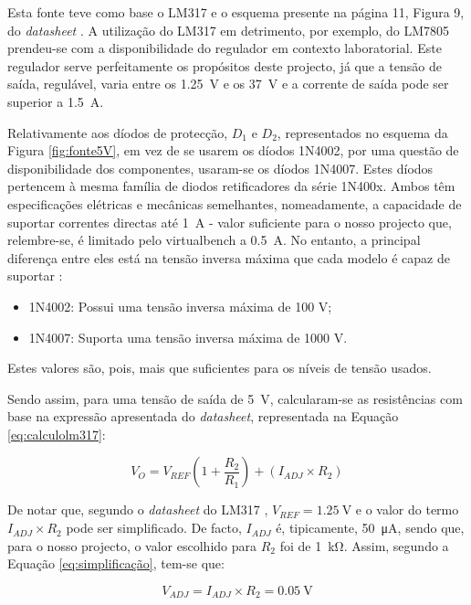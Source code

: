 Esta fonte teve como base o LM317 e o esquema presente na página 11, Figura 9, do \textit{datasheet} \cite{LM317}. A utilização do LM317 em detrimento, por exemplo, do LM7805 prendeu-se com a disponibilidade do regulador em contexto laboratorial. Este regulador serve perfeitamente os propósitos deste projecto, já que a tensão de saída, regulável, varia entre os \SI{1,25}{\volt} e os \SI{37}{\volt} e a corrente de saída pode ser superior a \SI{1,5}{\ampere}. 

Relativamente aos díodos de protecção, $D_{1}$ e $D_{2}$, representados no esquema da Figura \ref{fig:fonte5V}, em vez de se usarem os díodos 1N4002, por uma questão de disponibilidade dos componentes, usaram-se os díodos 1N4007. Estes díodos pertencem à mesma família de diodos retificadores da série 1N400x. Ambos têm especificações elétricas e mecânicas semelhantes, nomeadamente, a capacidade de suportar correntes directas até \SI{1}{\ampere} - valor suficiente para o nosso projecto que, relembre-se, é limitado pelo \acrshort{virtualbench} a \SI{0,5}{\ampere}. No entanto, a principal diferença entre eles está na tensão inversa máxima que cada modelo é capaz de suportar \cite{1N400x}:

\begin{itemize}
	\item 1N4002: Possui uma tensão inversa máxima de 100 V;
	\item 1N4007: Suporta uma tensão inversa máxima de 1000 V.
\end{itemize}

Estes valores são, pois, mais que suficientes para os níveis de tensão usados.

Sendo assim, para uma tensão de saída de \SI{5}{\volt}, calcularam-se as resistências com base na expressão apresentada do \textit{datasheet}, representada na Equação \ref{eq:calculolm317}: 

\begin{equation} \label{eq:calculolm317}
	V_{O} = V_{REF} (1 + \frac{R_{2}}{R_{1}}) + (I_{ADJ} \times R_{2})
\end{equation}

De notar que, segundo o \textit{datasheet} do LM317 \cite{LM317}, $V_{REF} = \SI{1,25}{\volt}$ e o valor do termo $I_{ADJ} \times R_{2}$ pode ser simplificado. De facto, $I_{ADJ}$ é, tipicamente, \SI{50}{\micro\ampere}, sendo que, para o nosso projecto, o valor escolhido para $R_{2}$ foi de \SI{1}{\kilo\ohm}. Assim, segundo a Equação \ref{eq:simplificação}, tem-se que:

\begin{equation} \label{eq:simplificação}
	V_{ADJ} = I_{ADJ} \times R_{2} = \SI{0,05}{\volt}
\end{equation}

